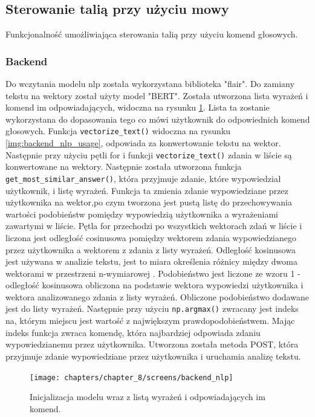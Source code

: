 \subsection{Sterowanie talią przy użyciu mowy}
Funkcjonalność umożliwiająca sterowania talią przy użyciu komend głosowych.


\subsubsection{Backend}
Do wczytania modelu nlp została wykorzystana biblioteka "flair". Do zamiany tekstu na wektory został użyty model "BERT". Została utworzona lista wyrażeń i komend im odpowiadających, widoczna na rysunku \ref{img:backend_nlp}. Lista ta zostanie  wykorzystana do dopasowania tego co mówi użytkownik do odpowiednich komend głosowych. Funkcja \texttt{vectorize\_text()} widoczna na rysunku \ref{img:backend_nlp_usage}, odpowiada za konwertowanie tekstu na wektor. Następnie przy użyciu pętli for i funkcji \texttt{vectorize\_text()} zdania w liście są konwertowane na wektory. Następnie została utworzona funkcja \texttt{get\_most\_similar\_answer()}, która przyjmuje zdanie, które wypowiedział użytkownik, i listę wyrażeń. Funkcja ta zmienia zdanie wypowiedziane przez użytkownika na wektor,po czym tworzona jest pustą listę do przechowywania wartości podobieństw pomiędzy wypowiedzią użytkownika a wyrażeniami zawartymi w liście. Pętla for przechodzi po wszystkich wektorach zdań w liście i liczona jest odległość cosinusowa pomiędzy wektorem zdania wypowiedzianego przez użytkownika a wektorem z zdania z listy wyrażeń. Odległość kosinusowa jest używana w analizie tekstu, jest to miara określenia różnicy między dwoma wektorami w przestrzeni n-wymiarowej \cite{dataMining}. Podobieństwo jest liczone ze wzoru 1 - odległość kosinusowa obliczona na podstawie wektora wypowiedzi użytkownika i wektora analizowanego zdania z listy wyrażeń. Obliczone podobieństwo dodawane jest do listy wyrażeń. Następnie przy użyciu \texttt{np.argmax()} zwracany jest indeks na, którym miejscu jest wartość z największym prawdopodobieństwem. Mając indeks funkcja zwraca komendę, która  najbardziej odpowiada zdaniu wypowiedzianemu przez użytkownika. Utworzona została metoda POST, która przyjmuje zdanie wypowiedziane przez użytkownika i uruchamia analizę tekstu.


\begin{figure}[H]
    \centering
    \texttt{[image: chapters/chapter\_8/screens/backend\_nlp]}
    \caption{Inicjalizacja modelu wraz z listą wyrażeń i odpowiadających im komend.}
    \label{img:backend_nlp}
\end{figure}


